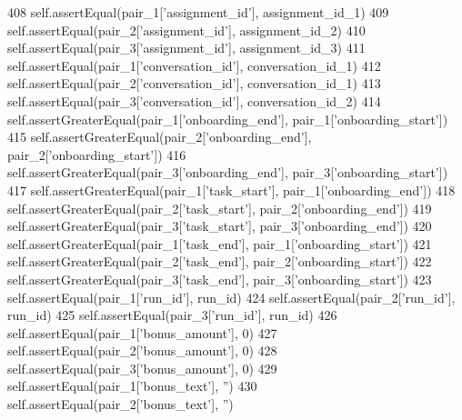 \begin{DoxyCode}
408         self.assertEqual(pair\_1[\textcolor{stringliteral}{'assignment\_id'}], assignment\_id\_1)
409         self.assertEqual(pair\_2[\textcolor{stringliteral}{'assignment\_id'}], assignment\_id\_2)
410         self.assertEqual(pair\_3[\textcolor{stringliteral}{'assignment\_id'}], assignment\_id\_3)
411         self.assertEqual(pair\_1[\textcolor{stringliteral}{'conversation\_id'}], conversation\_id\_1)
412         self.assertEqual(pair\_2[\textcolor{stringliteral}{'conversation\_id'}], conversation\_id\_1)
413         self.assertEqual(pair\_3[\textcolor{stringliteral}{'conversation\_id'}], conversation\_id\_2)
414         self.assertGreaterEqual(pair\_1[\textcolor{stringliteral}{'onboarding\_end'}], pair\_1[\textcolor{stringliteral}{'onboarding\_start'}])
415         self.assertGreaterEqual(pair\_2[\textcolor{stringliteral}{'onboarding\_end'}], pair\_2[\textcolor{stringliteral}{'onboarding\_start'}])
416         self.assertGreaterEqual(pair\_3[\textcolor{stringliteral}{'onboarding\_end'}], pair\_3[\textcolor{stringliteral}{'onboarding\_start'}])
417         self.assertGreaterEqual(pair\_1[\textcolor{stringliteral}{'task\_start'}], pair\_1[\textcolor{stringliteral}{'onboarding\_end'}])
418         self.assertGreaterEqual(pair\_2[\textcolor{stringliteral}{'task\_start'}], pair\_2[\textcolor{stringliteral}{'onboarding\_end'}])
419         self.assertGreaterEqual(pair\_3[\textcolor{stringliteral}{'task\_start'}], pair\_3[\textcolor{stringliteral}{'onboarding\_end'}])
420         self.assertGreaterEqual(pair\_1[\textcolor{stringliteral}{'task\_end'}], pair\_1[\textcolor{stringliteral}{'onboarding\_start'}])
421         self.assertGreaterEqual(pair\_2[\textcolor{stringliteral}{'task\_end'}], pair\_2[\textcolor{stringliteral}{'onboarding\_start'}])
422         self.assertGreaterEqual(pair\_3[\textcolor{stringliteral}{'task\_end'}], pair\_3[\textcolor{stringliteral}{'onboarding\_start'}])
423         self.assertEqual(pair\_1[\textcolor{stringliteral}{'run\_id'}], run\_id)
424         self.assertEqual(pair\_2[\textcolor{stringliteral}{'run\_id'}], run\_id)
425         self.assertEqual(pair\_3[\textcolor{stringliteral}{'run\_id'}], run\_id)
426         self.assertEqual(pair\_1[\textcolor{stringliteral}{'bonus\_amount'}], 0)
427         self.assertEqual(pair\_2[\textcolor{stringliteral}{'bonus\_amount'}], 0)
428         self.assertEqual(pair\_3[\textcolor{stringliteral}{'bonus\_amount'}], 0)
429         self.assertEqual(pair\_1[\textcolor{stringliteral}{'bonus\_text'}], \textcolor{stringliteral}{''})
430         self.assertEqual(pair\_2[\textcolor{stringliteral}{'bonus\_text'}], \textcolor{stringliteral}{''})

\end{DoxyCode}

